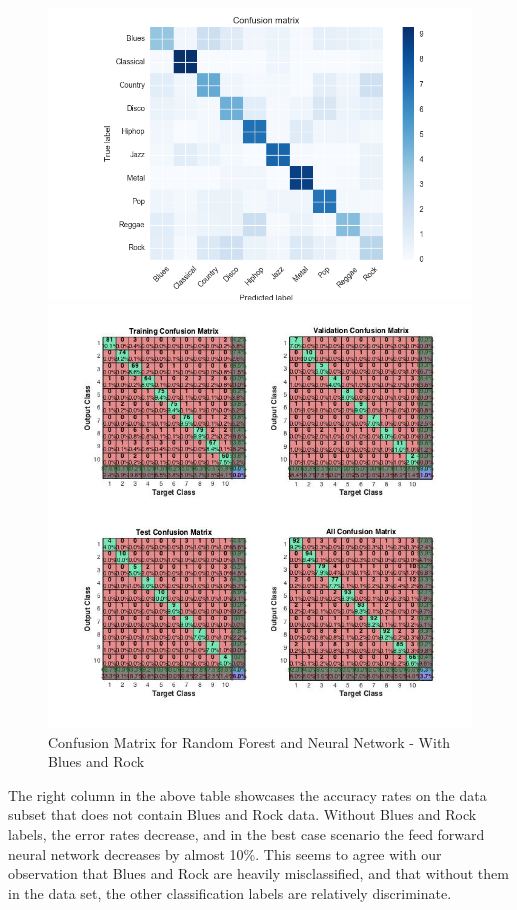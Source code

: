 \documentclass{article} %
\begin{document}
\begin{figure}[!ht]
\begin{center}
\caption{Confusion Matrix for Random Forest and Neural Network - With Blues and Rock}
\begin{minipage}[b]{0.40\linewidth}
	\includegraphics[scale=0.40]{ConfusionMatrix-RandomForest.png}
\end{minipage}
\quad
\begin{minipage}[b]{0.40\linewidth}
	\includegraphics[scale=0.30]{ConfusionMatrix-NN.jpg}
\end{minipage}
\end{center}
\end{figure}
The right column in the above table showcases the accuracy rates on the data subset that does not contain Blues and Rock data. Without Blues and Rock labels, the error rates decrease, and in the best case scenario the feed forward neural network decreases by almost 10\%. This seems to agree with our observation that Blues and Rock are heavily misclassified, and that without them in the data set, the other classification labels are relatively discriminate.
\end{document}
